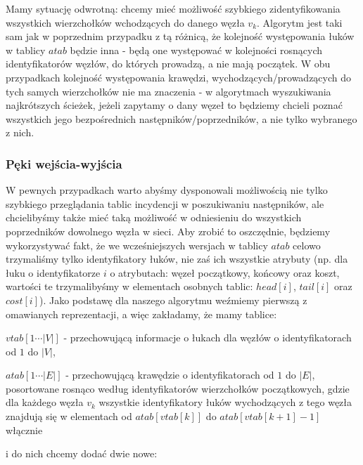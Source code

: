 Mamy sytuację odwrotną: chcemy mieć możliwość szybkiego zidentyfikowania wszystkich wierzchołków wchodzących do danego węzła $v_{k}$. Algorytm jest taki sam jak w poprzednim przypadku z tą różnicą, że kolejność występowania łuków w tablicy $atab$ będzie inna - będą one występować w kolejności rosnących identyfikatorów węzłów, do których prowadzą, a nie mają początek. W obu przypadkach kolejność występowania krawędzi, wychodzących/prowadzących do tych samych wierzchołków nie ma znaczenia - w algorytmach wyszukiwania najkrótszych ścieżek, jeżeli zapytamy o dany węzeł to będziemy chcieli poznać wszystkich jego bezpośrednich następników/poprzedników, a nie tylko wybranego z nich.

\subsubsection{Pęki wejścia-wyjścia}

W pewnych przypadkach warto abyśmy dysponowali możliwością nie tylko szybkiego przeglądania tablic incydencji w poszukiwaniu następników, ale chcielibyśmy także mieć taką możliwość w odniesieniu do wszystkich poprzedników dowolnego węzła w sieci. Aby zrobić to oszczędnie, będziemy wykorzystywać fakt, że we wcześniejszych wersjach w tablicy $atab$ celowo trzymaliśmy tylko identyfikatory łuków, nie zaś ich wszystkie atrybuty (np. dla łuku o identyfikatorze $i$ o atrybutach: węzeł początkowy, końcowy oraz koszt, wartości te trzymalibyśmy w elementach osobnych tablic: $head \left[ i \right] $,  $tail \left[ i \right] $ oraz  $cost \left[ i \right] $). Jako podstawę dla naszego algorytmu weźmiemy pierwszą z omawianych reprezentacji, a więc zakładamy, że mamy tablice:

\begin{myitemize}
	\item $ vtab \left[ 1 \cdots \left| V \right| \right] $ - przechowującą informacje o łukach dla węzłów o identyfikatorach od $1$ do $ \left| V \right| $,
	\item $atab \left[ 1 \cdots \left| E \right| \right] $ - przechowującą krawędzie o identyfikatorach od $1$ do $ \left| E \right| $, posortowane rosnąco według identyfikatorów wierzchołków początkowych, gdzie dla każdego węzła $v_{k}$ wszystkie identyfikatory łuków wychodzących z tego węzła znajdują się w elementach od $atab \left[ vtab \left[ k \right] \right] $ do $atab \left[ vtab \left[ k+1 \right] -1 \right] $ włącznie
\end{myitemize}

i do nich chcemy dodać dwie nowe:

